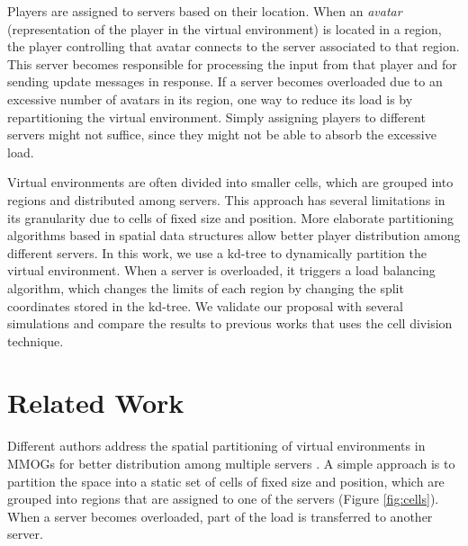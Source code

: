 \documentclass[acmjacm]{acmtrans2m}
\newcommand{\figurecaption}{Figure}
\begin{document}
Players are assigned to servers based on their location. When an \emph{avatar} (representation of the player in the virtual environment) is located in a region, the player controlling that avatar connects to the server associated to that region. This server becomes responsible for processing the input from that player and for sending update messages in response. If a server becomes overloaded due to an excessive number of avatars in its region, one way to reduce its load is by repartitioning the virtual environment. Simply assigning players to different servers might not suffice, since they might not be able to absorb the excessive load.

Virtual environments are often divided into smaller cells, which are grouped into regions and distributed among servers. This approach has several limitations in its granularity due to cells of fixed size and position. More elaborate partitioning algorithms based in spatial data structures\cite{samet2005} allow better player distribution among different servers. In this work, we use a kd-tree to dynamically partition the virtual environment. When a server is overloaded, it triggers a load balancing algorithm, which changes the limits of each region by changing the split coordinates stored in the kd-tree. We validate our proposal with several simulations and compare the results to previous works that uses the cell division technique.

%

\section{Related Work}
\label{context}

Different authors address the spatial partitioning of virtual environments in MMOGs for better distribution among multiple servers \cite{ahmed2008mol,bezerra2009lbs}. A simple approach is to partition the space into a static set of cells of fixed size and position, which are grouped into regions that are assigned to one of the servers (\figurecaption{} \ref{fig:cells}). When a server becomes overloaded, part of the load is transferred to another server.
\end{document}
